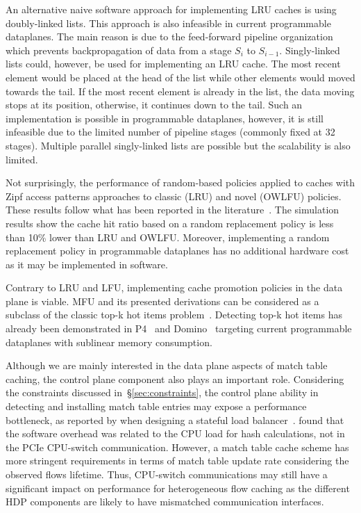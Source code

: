 An alternative naive software approach for implementing LRU caches is using doubly-linked lists.
This approach is also infeasible in current programmable dataplanes.
The main reason is due to the feed-forward pipeline organization which prevents backpropagation of data from a stage $S_{i}$ to $S_{i-1}$.
Singly-linked lists could, however, be used for implementing an LRU cache.
The most recent element would be placed at the head of the list while other elements would moved towards the tail.
If the most recent element is already in the list, the data moving stops at its position, otherwise, it continues down to the tail.
Such an implementation is possible in programmable dataplanes, however, it is still infeasible due to the limited number of pipeline stages (commonly fixed at 32 stages).
Multiple parallel singly-linked lists are possible but the scalability is also limited.

Not surprisingly, the performance of random-based policies applied to caches with Zipf access patterns approaches to classic (LRU) and novel (OWLFU) policies.
These results follow what has been reported in the literature~\cite{Gallo:2014}.
The simulation results show the cache hit ratio based on a random replacement policy is less than 10\% lower than LRU and OWLFU.
Moreover, implementing a random replacement policy in programmable dataplanes has no additional hardware cost as it may be implemented in software.

Contrary to LRU and LFU, implementing cache promotion policies in the data plane is viable.
MFU and its presented derivations can be considered as a subclass of the classic top-k hot items problem~\cite{Metwally:2005}.
Detecting top-k hot items has already been demonstrated in P4~\cite{Sivaraman:17} and Domino~\cite{SivaramanDomino:2016} targeting current programmable dataplanes with sublinear memory consumption.

Although we are mainly interested in the data plane aspects of match table caching, the control plane component also plays an important role.
Considering the constraints discussed in~\S\ref{sec:constraints}, the control plane ability in detecting and installing match table entries may expose a performance bottleneck, as reported by \citeauthor{Miao:2017} when designing a stateful load balancer~\cite{Miao:2017}.
\citeauthor{Miao:2017} found that the software overhead was related to the CPU load for hash calculations, not in the PCIe CPU-switch communication.
However, a match table cache scheme has more stringent requirements in terms of match table update rate considering the observed flows lifetime.
Thus, CPU-switch communications may still have a significant impact on performance for heterogeneous flow caching as the different HDP components are likely to have mismatched communication interfaces.

